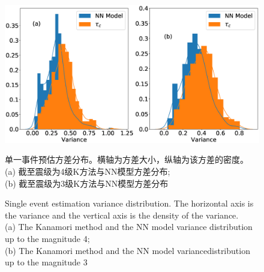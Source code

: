 \begin{figure}[!h] 
\centering 
 \includegraphics[width=\linewidth]{img/9.eps} 
 \renewcommand{\figurename}{图} 
\caption{单一事件预估方差分布。横轴为方差大小，纵轴为该方差的密度。\\
(a) 截至震级为4级K方法与NN模型方差分布;\\
(b) 截至震级为3级K方法与NN模型方差分布\\
} 
\addtocounter{figure}{-1} \vspace{-5pt} 
\renewcommand{\figurename}{Fig} 
\caption{Single event estimation variance distribution. The horizontal axis is the variance and the vertical axis is the density of the variance.\\
(a) The Kanamori method and the NN model variance distribution up to the
magnitude 4; \\
(b) The Kanamori method and the NN model variancedistribution up to the magnitude 3} 
\renewcommand{\figurename}{图} 
\label{fig:network-device-influence.png} 
\end{figure}


